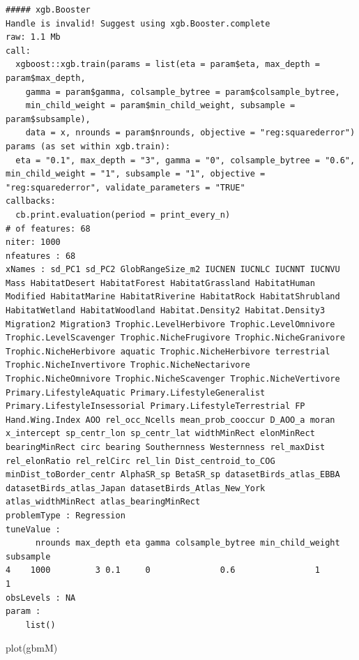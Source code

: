 \documentclass[
  letterpaper,
  DIV=11,
  numbers=noendperiod]{scrreprt}
\newenvironment{Shaded}{\begin{snugshade}}{\end{snugshade}}
\newcommand{\FunctionTok}[1]{\textcolor[rgb]{0.28,0.35,0.67}{#1}}
\newcommand{\NormalTok}[1]{\textcolor[rgb]{0.00,0.23,0.31}{#1}}
\begin{document}
\begin{verbatim}
##### xgb.Booster
Handle is invalid! Suggest using xgb.Booster.complete
raw: 1.1 Mb 
call:
  xgboost::xgb.train(params = list(eta = param$eta, max_depth = param$max_depth, 
    gamma = param$gamma, colsample_bytree = param$colsample_bytree, 
    min_child_weight = param$min_child_weight, subsample = param$subsample), 
    data = x, nrounds = param$nrounds, objective = "reg:squarederror")
params (as set within xgb.train):
  eta = "0.1", max_depth = "3", gamma = "0", colsample_bytree = "0.6", min_child_weight = "1", subsample = "1", objective = "reg:squarederror", validate_parameters = "TRUE"
callbacks:
  cb.print.evaluation(period = print_every_n)
# of features: 68 
niter: 1000
nfeatures : 68 
xNames : sd_PC1 sd_PC2 GlobRangeSize_m2 IUCNEN IUCNLC IUCNNT IUCNVU Mass HabitatDesert HabitatForest HabitatGrassland HabitatHuman Modified HabitatMarine HabitatRiverine HabitatRock HabitatShrubland HabitatWetland HabitatWoodland Habitat.Density2 Habitat.Density3 Migration2 Migration3 Trophic.LevelHerbivore Trophic.LevelOmnivore Trophic.LevelScavenger Trophic.NicheFrugivore Trophic.NicheGranivore Trophic.NicheHerbivore aquatic Trophic.NicheHerbivore terrestrial Trophic.NicheInvertivore Trophic.NicheNectarivore Trophic.NicheOmnivore Trophic.NicheScavenger Trophic.NicheVertivore Primary.LifestyleAquatic Primary.LifestyleGeneralist Primary.LifestyleInsessorial Primary.LifestyleTerrestrial FP Hand.Wing.Index AOO rel_occ_Ncells mean_prob_cooccur D_AOO_a moran x_intercept sp_centr_lon sp_centr_lat widthMinRect elonMinRect bearingMinRect circ bearing Southernness Westernness rel_maxDist rel_elonRatio rel_relCirc rel_lin Dist_centroid_to_COG minDist_toBorder_centr AlphaSR_sp BetaSR_sp datasetBirds_atlas_EBBA datasetBirds_atlas_Japan datasetBirds_Atlas_New_York atlas_widthMinRect atlas_bearingMinRect 
problemType : Regression 
tuneValue :
      nrounds max_depth eta gamma colsample_bytree min_child_weight subsample
4    1000         3 0.1     0              0.6                1         1
obsLevels : NA 
param :
    list()
\end{verbatim}

\begin{Shaded}
\begin{Highlighting}[]
\FunctionTok{plot}\NormalTok{(gbmM)}
\end{Highlighting}
\end{Shaded}
\end{document}

